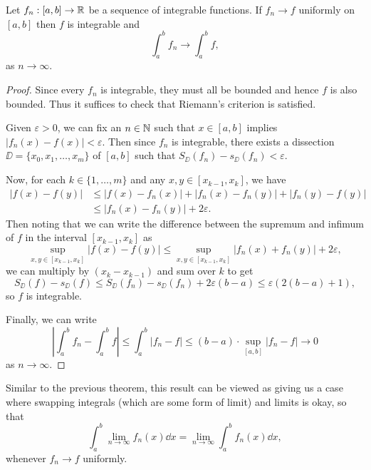 \documentclass[a4paper]{scrartcl}
\begin{document}

\begin{theorem}\label{thm3}
Let $f_n: [a, b] \rightarrow \mathbb{R}$ be a sequence of integrable functions. If $f_n \rightarrow f$ uniformly on $[a, b]$ then $f$ is integrable and
$$
\int_a^b f_n \rightarrow \int_a^b f,
$$
as $n \rightarrow \infty$.
\end{theorem}
\begin{proof}
    Since every $f_n$ is integrable, they must all be bounded and hence $f$ is also bounded. Thus it suffices to check that Riemann's criterion is satisfied.

    Given $\varepsilon > 0$, we can fix an $n \in \mathbb{N}$ such that $x \in [a, b]$ implies $|f_n(x) - f(x)| < \varepsilon$. Then since $f_n$ is integrable, there exists a dissection $\DD = \{x_0, x_1, \dots, x_m\}$ of $[a, b]$ such that $S_{\DD}(f_n) - s_{\DD}(f_n) < \varepsilon$. 

    Now, for each $k \in \{1, \dots, m\}$ and any $x,y \in[x_{k - 1}, x_k]$, we have
    \begin{align*}
        |f(x) - f(y)| &\leq |f(x) - f_n(x)| + |f_n(x) - f_n(y)| + |f_n(y) - f(y)| \\
        &\leq |f_n(x) - f_n(y)| + 2 \varepsilon.
    \end{align*}
    Then noting that we can write the difference between the supremum and infimum of $f$ in the interval $[x_{k - 1}, x_k]$ as
    $$
        \sup_{x, y \in [x_{k - 1}, x_k]} |f(x) - f(y)| \leq \sup_{x, y \in [x_{k - 1}, x_k]} |f_n(x) + f_n(y)| + 2 \varepsilon,
    $$
    we can multiply by $(x_k - x_{k - 1})$ and sum over $k$ to get 
    $$ 
    S_{\DD}(f) - s_{\DD}(f) \leq S_{\DD}(f_n) - s_{\DD}(f_n) + 2 \varepsilon (b - a) \leq \varepsilon (2(b - a) + 1),
    $$
    so $f$ is integrable.

    Finally, we can write
    $$
    \left|\int_a^b f_n - \int_a^b f\right| \leq \int_a^b |f_n - f| \leq (b - a) \cdot \sup_{[a, b]} |f_n - f| \rightarrow 0
    $$
    as $n \rightarrow \infty$.
\end{proof}

Similar to the previous theorem, this result can be viewed as giving us a case where swapping integrals (which are some form of limit) and limits is okay, so that
$$
    \int_a^b \lim_{n \to \infty} f_n(x) \dd x = \lim_{n \to \infty} \int_a^b f_n(x) \dd x,
$$
whenever $f_n \rightarrow f$ uniformly.
\end{document}
